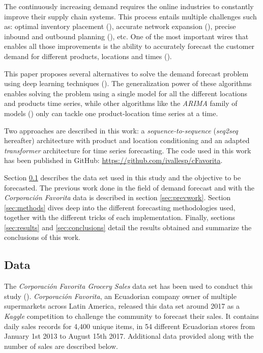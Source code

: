 \documentclass{elsarticle}
\begin{document}
	The continuously increasing demand requires the online industries to constantly improve their supply chain systems. This process entails multiple challenges such as: optimal inventory placement (\cite{graves2008}), accurate network expansion (\cite{hossein2017}), precise inbound and outbound planning (\cite{kaipia2009}), etc. One of the most important wires that enables all those improvements is the ability to accurately forecast the customer demand for different products, locations and times (\cite{forslund2007}).  
	
	This paper proposes several alternatives to solve the demand forecast problem using deep learning techniques (\cite{Goodfellow2016}). The generalization power of these algorithms enables solving the problem using a single model for all the different locations and products time series, while other algorithms like the \textit{ARIMA} family of models (\cite{Hyndman2018}) only can tackle one product-location time series at a time. 
	
	Two approaches are described in this work: a \textit{sequence-to-sequence} (\textit{seq2seq} hereafter) architecture with product and location conditioning and an adapted \textit{transformer} architecture for time series forecasting. The code used in this work has been published in GitHub: \url{https://github.com/ivallesp/cFavorita}.
	
	 Section \ref{sec:data} describes the data set used in this study and the objective to be forecasted. The previous work done in the field of demand forecast and with the \textit{Corporación Favorita} data is described in section \ref{sec:prevwork}. Section \ref{sec:methods} dives deep into the different forecasting methodologies used, together with the different tricks of each implementation. 
	Finally, sections \ref{sec:results} and \ref{sec:conclusions} detail the results obtained and summarize the conclusions of this work.
	
	
	\subsection{Data} \label{sec:data}
	The \textit{Corporación Favorita Grocery Sales} data set  has been used to conduct this study (\cite{corporacionfavoritadataset2018}). \textit{Corporación Favorita}, an Ecuadorian company owner of multiple supermarkets across Latin America, released this data set around 2017 as a \textit{Kaggle} competition to challenge the community to forecast their sales. It contains daily sales records for 4,400 unique items, in 54 different Ecuadorian stores from January 1st 2013 to August 15th 2017. Additional data provided along with the number of sales are described below.
	
\end{document}
